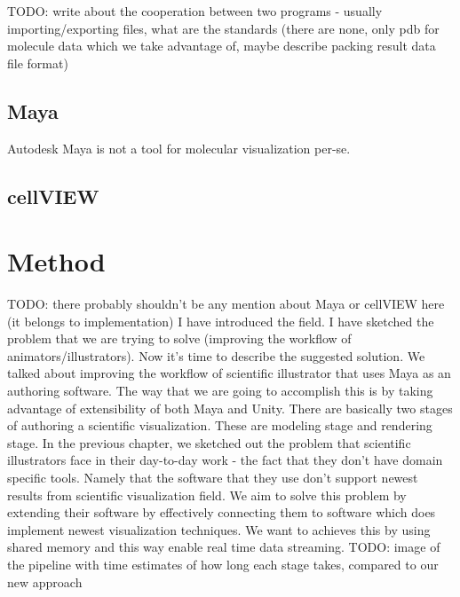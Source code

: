 \documentclass[
  digital, %
  table,   %
  lof,     %
  lot,     %
]{fithesis3}
\begin{document}
TODO: write about the cooperation between two programs - usually importing/exporting files, what are the standards (there are none, only pdb for molecule data which we take advantage of, maybe describe packing result data file format)

\section{Maya}
Autodesk Maya is not a tool for molecular visualization per-se.
\section{cellVIEW}

\chapter{Method}
TODO: there probably shouldn't be any mention about Maya or cellVIEW here (it belongs to implementation)
I have introduced the field. I have sketched the problem that we are trying to solve (improving the workflow of animators/illustrators). Now it's time to describe the suggested solution.
We talked about improving the workflow of scientific illustrator that uses Maya as an authoring software. The way that we are going to accomplish this is by taking advantage of extensibility of both Maya and Unity. 
There are basically two stages of authoring a scientific visualization. These are modeling stage and rendering stage.
In the previous chapter, we sketched out the problem that scientific illustrators face in their day-to-day work - the fact that they don't have domain specific tools. Namely that the software that they use don't support newest results from scientific visualization field. We aim to solve this problem by extending their software by effectively connecting them to software which does implement newest visualization techniques. We want to achieves this by using shared memory and this way enable real time data streaming.
TODO: image of the pipeline with time estimates of how long each stage takes, compared to our new approach
\end{document}

